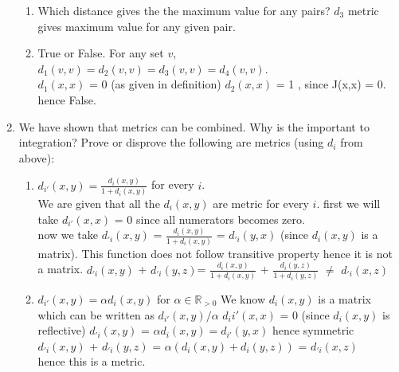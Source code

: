 \documentclass{article}
\begin{document}
\begin{enumerate}
\begin{enumerate}
\item Which distance gives the the maximum value for any pairs?  
$d_3$ metric gives maximum value for any given pair.
\item \textsf{True or False}.  For any set $v$, $d_1(v,v) = d_2(v,v) = d_3(v,v) = d_4(v,v)$. \\
$d_1(x,x)$ = 0 (as given in definition)
$d_2(x,x)$ = 1 , since J(x,x) = 0. hence False.

\end{enumerate} 

\item We have shown that metrics can be combined.  Why is the important to integration? Prove or disprove the following are metrics (using $d_i$ from above):
\begin{enumerate}
\item $d_{i'}(x,y) = \frac{d_i(x,y)}{1 + d_i(x,y)}$ for every $i$. \\
We are given that all the $d_i(x,y)$ are metric	for every $i$.
first we will take $d_{i'}(x,x)$ = 0 since all numerators becomes zero. \\
now we take $d_{'i}(x,y)$ = $\frac{d_i(x,y)}{1+d_i(x,y)}$ = $d_{'i}(y,x)$
(since $d_i(x,y)$ is a matrix).
This function does not follow transitive property hence it is not a matrix.
$d_{'i}(x,y)$ +  $d_{'i}(y,z)$= $\frac{d_i(x,y)}{1+d_i(x,y)}$ + $\frac{d_i(y,z)}{1+d_i(y,z)}$ $\neq$ $d_{'i}(x,z)$ 

\item $d_{i'}(x,y) = \alpha d_i(x,y)$ for $\alpha\in\mathbb{R}_{>0}$ 
We know $d_i(x,y)$ is a matrix which can be written as $d_{i'}(x,y)/\alpha$
$d_i{i'}(x,x)$ = 0 (since $d_i(x,y)$ is reflective)
$d_{'i}(x,y)$ = $\alpha d_i(x,y) = d_{i'}(y,x)$ hence symmetric \\
$d_{'i}(x,y)$ + $d_{'i}(y,z)$ = $\alpha (d_i(x,y) + d_i(y,z))$ = $d_{'i}(x,z)$  \\
hence this is a metric.




\end{enumerate}
\end{enumerate}
\end{document}
